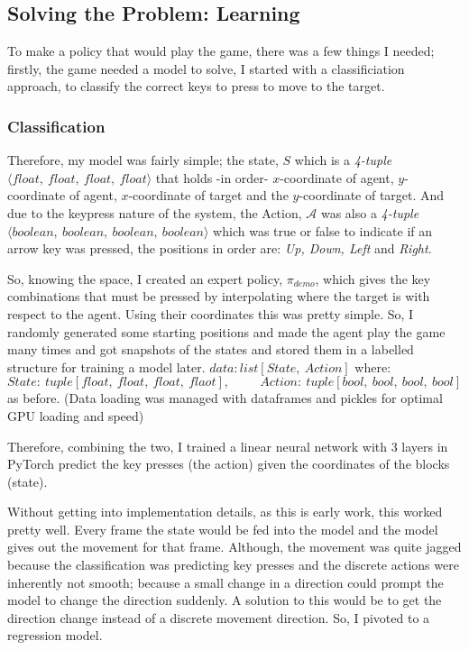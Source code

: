 \subsection{Solving the Problem: Learning}
To make a policy that would play the game, there was a few things I needed; firstly, the game needed a model to solve, I started with a classificiation approach, to classify the correct keys to press to move to the target.


\subsubsection{Classification}
Therefore, my model was fairly simple; the state, $S$ which is a \emph{4-tuple} $\langle float,~float,~float,~float \rangle$ that holds -in order- $x$-coordinate of agent, $y$-coordinate of agent, $x$-coordinate of target and the $y$-coordinate of target. And due to the keypress nature of the system, the Action, $\mathcal{A}$ was also a \emph{4-tuple} $\langle boolean,~boolean,~boolean,~boolean \rangle$ which was true or false to indicate if an arrow key was pressed, the positions in order are: \emph{Up, Down, Left} and \emph{Right}.

So, knowing the space, I created an expert policy, \(\pi_{demo}\), which gives the key combinations that must be pressed by interpolating where the target is with respect to the agent. Using their coordinates this was pretty simple. So, I randomly generated some starting positions and made the agent play the game many times and got snapshots of the states and stored them in a labelled structure for training a model later. \(data: list\left[State,~Action\right]\) where:
\[
  State:~tuple\left[float,~float,~float,~flaot\right], 
  \hspace{1cm} Action:~tuple\left[bool,~bool,~bool,~bool\right]
\]
as before. (Data loading was managed with dataframes and pickles for optimal GPU loading and speed)

Therefore, combining the two, I trained a linear neural network with 3 layers in PyTorch \cite{pytorch} predict the key presses (the action) given the coordinates of the blocks (state).

Without getting into implementation details, as this is early work, this worked pretty well. Every frame the state would be fed into the model and the model gives out the movement for that frame. Although, the movement was quite jagged because the classification was predicting key presses and the discrete actions were inherently not smooth; because a small change in a direction could prompt the model to change the  direction suddenly. A solution to this would be to get the direction change instead of a discrete movement direction. So, I pivoted to a regression model.

